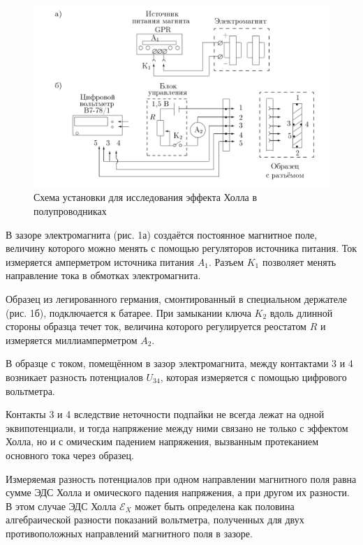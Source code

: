 \documentclass[a4paper]{article}
\theoremstyle{definition}
\theoremstyle{remark}
\begin{document}
	\begin{figure}[h!]
		\centering
		\includegraphics[width=\linewidth]{image/Holl2}
		\caption{Схема установки для исследования эффекта Холла в полупроводниках}
		\label{fig:Holl2}
	\end{figure}
  
  	В зазоре электромагнита (рис. 1а) создаётся постоянное магнитное поле, величину которого можно менять с помощью регуляторов источника питания. Ток измеряется амперметром источника питания $A_{1}$. Разъем $K_{1}$ позволяет менять направление тока в обмотках электромагнита.
  
  	Образец из легированного германия, смонтированный в специальном держателе (рис. 1б), подключается к батарее. При замыкании ключа $K_{2}$ вдоль длинной стороны образца течет ток, величина которого регулируется реостатом $R$ и измеряется миллиамперметром $A_{2}$.
  	
  	В образце с током, помещённом в зазор электромагнита, между контактами 3 и 4 возникает разность потенциалов $U_{34}$, которая измеряется с помощью цифрового вольтметра.
  	
  	Контакты 3 и 4 вследствие неточности подпайки не всегда лежат на одной
  	эквипотенциали, и тогда напряжение между ними связано не только с эффектом
  	Холла, но и с омическим падением напряжения, вызванным протеканием основного тока через образец.
  	
  	Измеряемая разность потенциалов при одном направлении
  	магнитного поля равна сумме ЭДС Холла и омического падения напряжения, а
  	при другом  их разности. В этом случае ЭДС Холла $\mathscr{E}_{X}$ может быть определена как половина алгебраической разности показаний вольтметра, полученных для
  	двух противоположных направлений магнитного поля в зазоре.
  	
\end{document}
